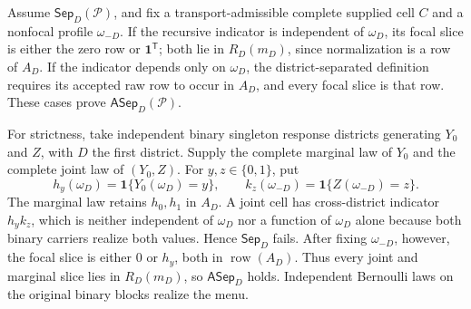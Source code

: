 Assume \(\mathsf{Sep}_D(\mathcal P)\), and fix a transport-admissible complete supplied cell \(C\) and a nonfocal profile \(\omega_{-D}\).  If the recursive indicator is independent of \(\omega_D\), its focal slice is either the zero row or \(\mathbf 1^{\mathsf T}\); both lie in \(R_D(m_D)\), since normalization is a row of \(A_D\).  If the indicator depends only on \(\omega_D\), the district-separated definition requires its accepted raw row to occur in \(A_D\), and every focal slice is that row.  These cases prove \(\mathsf{ASep}_D(\mathcal P)\).

For strictness, take independent binary singleton response districts generating \(Y_0\) and \(Z\), with \(D\) the first district.  Supply the complete marginal law of \(Y_0\) and the complete joint law of \((Y_0,Z)\).  For \(y,z\in\{0,1\}\), put
\[
h_y(\omega_D)=\mathbf 1\{Y_0(\omega_D)=y\},
\qquad k_z(\omega_{-D})=\mathbf 1\{Z(\omega_{-D})=z\}.
\]
The marginal law retains \(h_0,h_1\) in \(A_D\).  A joint cell has cross-district indicator \(h_yk_z\), which is neither independent of \(\omega_D\) nor a function of \(\omega_D\) alone because both binary carriers realize both values.  Hence \(\mathsf{Sep}_D\) fails.  After fixing \(\omega_{-D}\), however, the focal slice is either \(0\) or \(h_y\), both in \(\operatorname{row}(A_D)\).  Thus every joint and marginal slice lies in \(R_D(m_D)\), so \(\mathsf{ASep}_D\) holds.  Independent Bernoulli laws on the original binary blocks realize the menu.